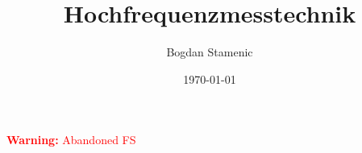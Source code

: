 

\newcommand{\FormelsammlungTitel}{Hochfrequenzmesstechnik}
\newcommand{\FormelsammlungAutor}{Bogdan Stamenic}
\setcounter{tocdepth}{2} %


	\title{\FormelsammlungTitel}
	\author{\FormelsammlungAutor}
	\date{\today}
	\begin{multicols}{3}
        {\small%
			\maketitle
			\tableofcontents
        {\LARGE \textcolor{red}{\textbf{Warning:} Abandoned FS}}
        
        
        
        }
	\end{multicols}

